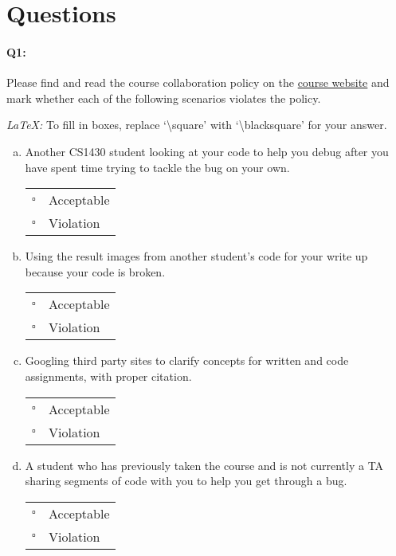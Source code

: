 \documentclass[11pt]{article}
\begin{document}
\section*{Questions}

\paragraph{Q1:} Please find and read the course collaboration policy on the \href{http://cs.brown.edu/courses/csci1430/}{course website} and mark whether each of the following scenarios violates the policy. 

\emph{LaTeX:} To fill in boxes, replace `\textbackslash square' with `\textbackslash blacksquare' for your answer.

\begin{enumerate}[(a)]
\item 
Another CS1430 student looking at your code to help you debug after you have spent time trying to tackle the bug on your own.

\begin{tabular}[h]{ll}
$\square$ & Acceptable \\
$\square$ & Violation \\
\end{tabular}

\item 
Using the result images from another student's code for your write up because your code is broken.

\begin{tabular}[h]{ll}
$\square$ & Acceptable \\
$\square$ & Violation \\
\end{tabular}

\item 
Googling third party sites to clarify concepts for written and code assignments, with proper citation.

\begin{tabular}[h]{ll}
$\square$ & Acceptable \\
$\square$ & Violation \\
\end{tabular}

\item 
A student who has previously taken the course and is not currently a TA sharing segments of code with you to help you get through a bug.

\begin{tabular}[h]{ll}
$\square$ & Acceptable \\
$\square$ & Violation \\
\end{tabular}

\end{enumerate}
\end{document}
